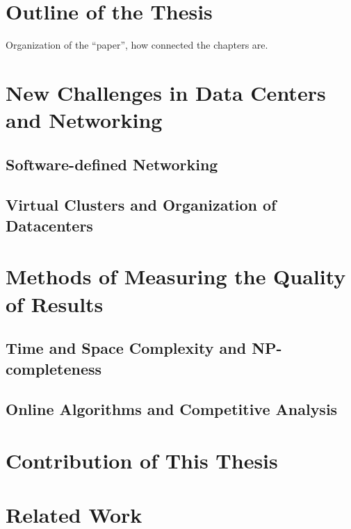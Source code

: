 \section{Outline of the Thesis}


Organization of the ``paper'', how connected the chapters are.

\section{New Challenges in Data Centers and Networking}

\subsection{Software-defined Networking}



\subsection{Virtual Clusters and Organization of Datacenters}





\section{Methods of Measuring the Quality of Results}

\subsection{Time and Space Complexity and NP-completeness}
\subsection{Online Algorithms and Competitive Analysis}

\section{Contribution of This Thesis}



\section{Related Work}


